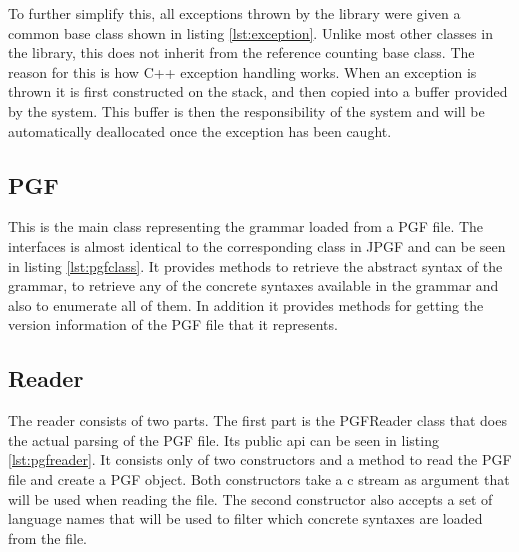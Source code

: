 To further simplify this, all exceptions thrown by the library were given a common base class shown in listing \ref{lst:exception}. Unlike most other classes in the library, this does not inherit from the reference counting base class. The reason for this is how C++ exception handling works. When an exception is thrown it is first constructed on the stack, and then copied into a buffer provided by the system. This buffer is then the responsibility of the system and will be automatically deallocated once the exception has been caught.




\subsection{PGF}
This is the main class representing the grammar loaded from a PGF file. The interfaces is almost identical to the corresponding class in JPGF and can be seen in listing \ref{lst:pgfclass}. It provides methods to retrieve the abstract syntax of the grammar, to retrieve any of the concrete syntaxes available in the grammar and also to enumerate all of them. In addition it provides methods for getting the version information of the PGF file that it represents.




\subsection{Reader}
The reader consists of two parts. The first part is the PGFReader class that does the actual parsing of the PGF file. Its public api can be seen in listing \ref{lst:pgfreader}. It consists only of two constructors and a method to read the PGF file and create a PGF object. Both constructors take a c stream as argument that will be used when reading the file. The second constructor also accepts a set of language names that will be used to filter which concrete syntaxes are loaded from the file.



